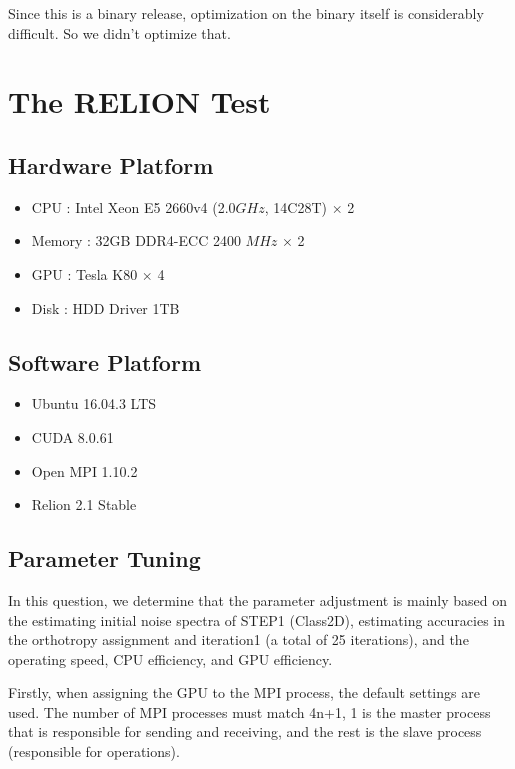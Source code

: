 \documentclass{mcmthesis}
\begin{document}
\par Since this is a binary release, optimization on the binary itself is considerably difficult. So we didn't optimize that.

\section{The RELION Test}

\subsection{Hardware Platform}

\begin{itemize}
	\item CPU : Intel Xeon E5 2660v4 (2.0$GHz$, 14C28T) $\times$ 2 
	\item Memory : 32GB DDR4-ECC 2400 $MHz$ $\times$ 2
	\item GPU : Tesla K80 $\times$ 4
	\item Disk : HDD Driver 1TB 
\end{itemize}


\subsection{Software Platform}

\begin{itemize}
	\item Ubuntu 16.04.3 LTS
	\item CUDA 8.0.61
	\item Open MPI 1.10.2
	\item Relion 2.1 Stable
\end{itemize}


\subsection{Parameter Tuning}





\par In this question, we determine that the parameter adjustment is mainly based on the estimating initial noise spectra of STEP1 (Class2D), estimating accuracies in the orthotropy assignment and iteration1 (a total of 25 iterations), and the operating speed, CPU efficiency, and GPU efficiency.


\par Firstly, when assigning the GPU to the MPI process, the default settings are used. The number of MPI processes must match 4n+1, 1 is the master process that is responsible for sending and receiving, and the rest is the slave process (responsible for operations).
\end{document}
